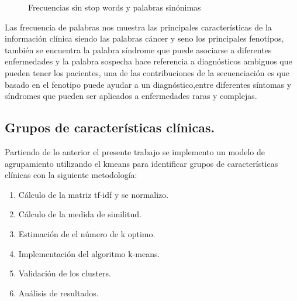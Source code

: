 \begin{figure}[]
	\centering
	\caption{Frecuencias sin stop words y palabras sinónimas} \label{fig:sin}
\end{figure} 

Las frecuencia de palabras nos muestra las principales características de la información clínica siendo las palabras cáncer y seno los principales fenotipos, también se encuentra la palabra síndrome que puede asociarse a diferentes  enfermedades y la palabra sospecha hace referencia a diagnósticos ambiguos que pueden tener los pacientes, una de las contribuciones de la secuenciación es que basado en el fenotipo puede ayudar a un diagnóstico,entre diferentes síntomas y síndromes que pueden ser aplicados a enfermedades raras y complejas\cite{Tetreault2015a}. \\

\subsection{Grupos de características clínicas.}

Partiendo de lo anterior el presente trabajo se implemento un modelo de agrupamiento utilizando el kmeans  para identificar grupos de características clínicas con la siguiente metodología:

\begin{enumerate}
	\item Cálculo de la matriz tf-idf y se normalizo.
	\item Cálculo de la medida de similitud.  
	\item Estimación de el número de k optimo.
	\item Implementación del algoritmo k-means.
	\item Validación de los clusters.
	\item Análisis de resultados. 	  
\end{enumerate}

